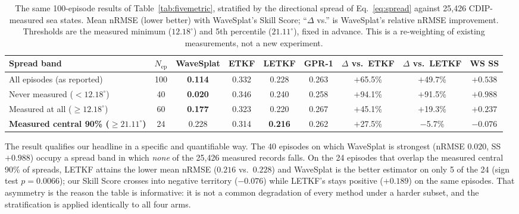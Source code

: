 \begin{table}[t]
\centering
\caption{The same 100-episode results of Table~\ref{tab:fivemetric},
stratified by the directional spread of Eq.~\eqref{eq:spread} against
25,426 CDIP-measured sea states.  Mean nRMSE (lower better) with WaveSplat's
Skill Score; ``$\Delta$ vs.'' is WaveSplat's relative nRMSE improvement.
Thresholds are the measured minimum ($12.18^\circ$) and 5th percentile
($21.11^\circ$), fixed in advance.  This is a re-weighting of existing
measurements, not a new experiment.}
\label{tab:extvalidity}
\begin{tabular}{lcccccccc}
\toprule
Spread band & $N_{\text{ep}}$ & WaveSplat & ETKF & LETKF & GPR-1 &
$\Delta$ vs.\ ETKF & $\Delta$ vs.\ LETKF & WS SS \\
\midrule
All episodes (as reported)        & 100 & \textbf{0.114} & 0.332 & 0.228 & 0.263 & $+$65.5\% & $+$49.7\% & $+0.538$ \\
Never measured ($<12.18^\circ$)   &  40 & \textbf{0.020} & 0.346 & 0.240 & 0.258 & $+$94.1\% & $+$91.5\% & $+0.988$ \\
Measured at all ($\geq12.18^\circ$) &  60 & \textbf{0.177} & 0.323 & 0.220 & 0.267 & $+$45.1\% & $+$19.3\% & $+0.237$ \\
\textbf{Measured central 90\% ($\geq21.11^\circ$)} & 24 & 0.228 & 0.314 & \textbf{0.216} & 0.262 & $+$27.5\% & $-$5.7\% & $-0.076$ \\
\bottomrule
\end{tabular}
\end{table}

The result qualifies our headline in a specific and quantifiable way.
The 40 episodes on which WaveSplat is strongest (nRMSE $0.020$, SS $+0.988$)
occupy a spread band in which \emph{none} of the 25,426 measured records
falls.  On the 24 episodes that overlap the measured central 90\% of spreads,
LETKF attains the lower mean nRMSE ($0.216$ vs.\ $0.228$) and WaveSplat is the
better estimator on only 5 of the 24 (sign test $p=0.0066$); our Skill Score
crosses into negative territory ($-0.076$) while LETKF's stays positive
($+0.189$) on the same episodes.  That asymmetry is the reason the table is
informative: it is not a common degradation of every method under a harder
subset, and the stratification is applied identically to all four arms.

